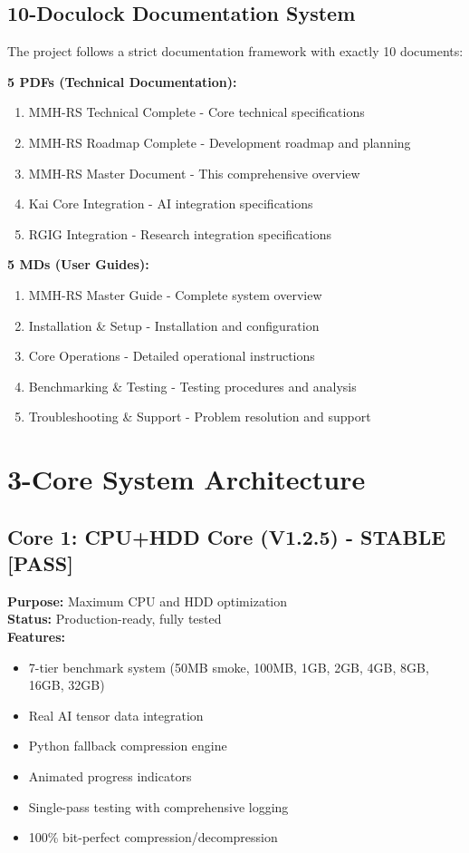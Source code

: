 \documentclass[12pt,a4paper]{article}
\begin{document}
\subsection{10-Doculock Documentation System}

The project follows a strict documentation framework with exactly 10 documents:

\textbf{5 PDFs (Technical Documentation):}
\begin{enumerate}
    \item MMH-RS Technical Complete - Core technical specifications
    \item MMH-RS Roadmap Complete - Development roadmap and planning
    \item MMH-RS Master Document - This comprehensive overview
    \item Kai Core Integration - AI integration specifications
    \item RGIG Integration - Research integration specifications
\end{enumerate}

\textbf{5 MDs (User Guides):}
\begin{enumerate}
    \item MMH-RS Master Guide - Complete system overview
    \item Installation \& Setup - Installation and configuration
    \item Core Operations - Detailed operational instructions
    \item Benchmarking \& Testing - Testing procedures and analysis
    \item Troubleshooting \& Support - Problem resolution and support
\end{enumerate}

\section{3-Core System Architecture}

\subsection{Core 1: CPU+HDD Core (V1.2.5) - STABLE [PASS]}

\textbf{Purpose:} Maximum CPU and HDD optimization\\
\textbf{Status:} Production-ready, fully tested\\
\textbf{Features:}
\begin{itemize}
    \item 7-tier benchmark system (50MB smoke, 100MB, 1GB, 2GB, 4GB, 8GB, 16GB, 32GB)
    \item Real AI tensor data integration
    \item Python fallback compression engine
    \item Animated progress indicators
    \item Single-pass testing with comprehensive logging
    \item 100\% bit-perfect compression/decompression
\end{itemize}
\end{document}
